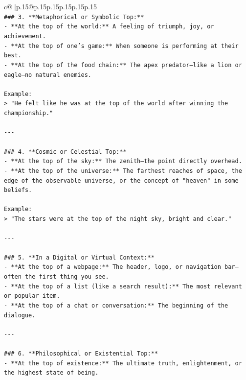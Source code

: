 \documentclass{article}
\begin{document}
{\begin{supertabular}{c@{$\;$}|p{.15\linewidth}@{}p{.15\linewidth}p{.15\linewidth}p{.15\linewidth}p{.15\linewidth}p{.15\linewidth}}
{{{\\ 
\texttt{\#\#\# 3. **Metaphorical or Symbolic Top:**} \\
\texttt{{-} **At the top of the world:** A feeling of triumph, joy, or achievement.} \\
\texttt{{-} **At the top of one’s game:** When someone is performing at their best.} \\
\texttt{{-} **At the top of the food chain:** The apex predator—like a lion or eagle—no natural enemies.} \\
\\ 
\texttt{Example:  } \\
\texttt{> "He felt like he was at the top of the world after winning the championship."} \\
\\ 
\texttt{{-}{-}{-}} \\
\\ 
\texttt{\#\#\# 4. **Cosmic or Celestial Top:**} \\
\texttt{{-} **At the top of the sky:** The zenith—the point directly overhead.} \\
\texttt{{-} **At the top of the universe:** The farthest reaches of space, the edge of the observable universe, or the concept of "heaven" in some beliefs.} \\
\\ 
\texttt{Example:  } \\
\texttt{> "The stars were at the top of the night sky, bright and clear."} \\
\\ 
\texttt{{-}{-}{-}} \\
\\ 
\texttt{\#\#\# 5. **In a Digital or Virtual Context:**} \\
\texttt{{-} **At the top of a webpage:** The header, logo, or navigation bar—often the first thing you see.} \\
\texttt{{-} **At the top of a list (like a search result):** The most relevant or popular item.} \\
\texttt{{-} **At the top of a chat or conversation:** The beginning of the dialogue.} \\
\\ 
\texttt{{-}{-}{-}} \\
\\ 
\texttt{\#\#\# 6. **Philosophical or Existential Top:**} \\
\texttt{{-} **At the top of existence:** The ultimate truth, enlightenment, or the highest state of being.} \\
}}}
\end{supertabular}}
\end{document}
